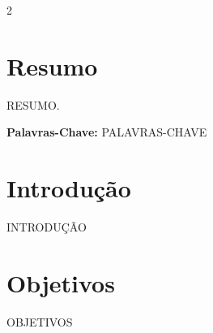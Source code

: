 \documentclass[a0,portrait]{a0poster}
\begin{document}
\begin{multicols}{2} %

\justify %



\section*{Resumo}
\vspace{-1cm}
RESUMO.

\vspace{1cm}

\hspace{-0,5cm}\textbf{Palavras-Chave:} PALAVRAS-CHAVE


\section*{Introdu\c c\~ao}
\vspace{-1cm}
INTRODUÇÃO



\section*{Objetivos}
\vspace{-1cm}
OBJETIVOS



\end{multicols}
\end{document}

